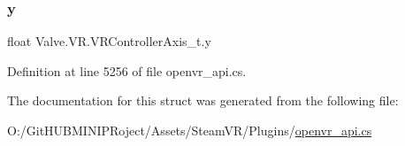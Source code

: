 \subsubsection{\texorpdfstring{y}{y}}
{\footnotesize\ttfamily float Valve.\+V\+R.\+V\+R\+Controller\+Axis\+\_\+t.\+y}



Definition at line 5256 of file openvr\+\_\+api.\+cs.



The documentation for this struct was generated from the following file\+:\begin{DoxyCompactItemize}
\item 
O\+:/\+Git\+H\+U\+B\+M\+I\+N\+I\+P\+Roject/\+Assets/\+Steam\+V\+R/\+Plugins/\mbox{\hyperlink{openvr__api_8cs}{openvr\+\_\+api.\+cs}}\end{DoxyCompactItemize}
